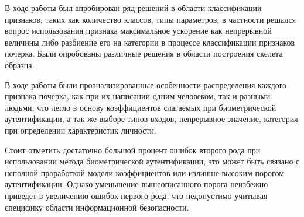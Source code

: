 В ходе работы был апробирован ряд решений в области классификации признаков, таких как количество классов, типы параметров, в частности решался вопрос использования признака максимальное ускорение как непрерывной величины либо разбиение его на категории в процессе классификации признаков почерка. Были опробованы различные решения в области построения скелета образца.

В ходе работы были проанализированные особенности распределения каждого признака почерка, как при их написании одним человеком, так и разными людьми, что легло в основу коэффициентов слагаемых при биометрической аутентификации, а так же выборе типов входов, непрерывное значение, категория при определении характеристик личности. 

Стоит отметить достаточно большой процент ошибок второго рода при использовании метода биометрической аутентификации, это может быть связано с неполной проработкой модели коэффициентов или излишне высоким порогом аутентификации. Однако уменьшение вышеописанного порога неизбежно приведет в увеличению ошибок первого рода, что недопустимо учитывая специфику области информационной безопасности.

\newcommand{\tableHead}{\hline Тип признака & Название признака & Отклонение от обучающей выборки \\ \hline}

